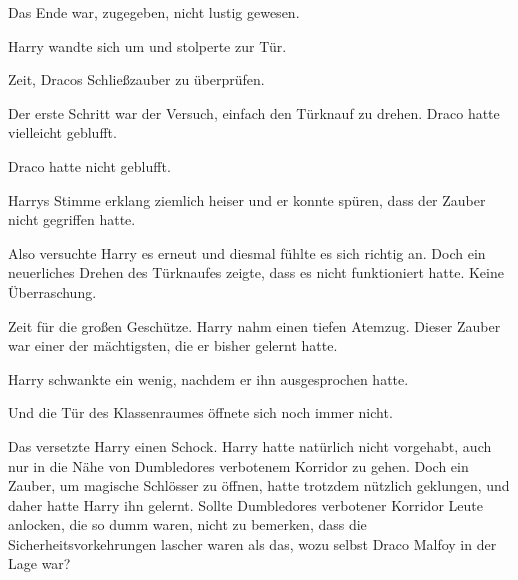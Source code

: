 Das Ende war, zugegeben, nicht lustig gewesen.

Harry wandte sich um und stolperte zur Tür.

Zeit, Dracos Schließzauber zu überprüfen.

Der erste Schritt war der Versuch, einfach den Türknauf zu drehen. Draco hatte vielleicht geblufft.

Draco hatte nicht geblufft.

 Harrys Stimme erklang ziemlich heiser und er konnte spüren, dass der Zauber nicht gegriffen hatte.

Also versuchte Harry es erneut und diesmal fühlte es sich richtig an. Doch ein neuerliches Drehen des Türknaufes zeigte, dass es nicht funktioniert hatte. Keine Überraschung.

Zeit für die großen Geschütze. Harry nahm einen tiefen Atemzug. Dieser Zauber war einer der mächtigsten, die er bisher gelernt hatte.


Harry schwankte ein wenig, nachdem er ihn ausgesprochen hatte.

Und die Tür des Klassenraumes öffnete sich noch immer nicht.

Das versetzte Harry einen Schock. Harry hatte natürlich nicht vorgehabt, auch nur in die Nähe von Dumbledores verbotenem Korridor zu gehen. Doch ein Zauber, um magische Schlösser zu öffnen, hatte trotzdem nützlich geklungen, und daher hatte Harry ihn gelernt. Sollte Dumbledores verbotener Korridor Leute anlocken, die so dumm waren, nicht zu bemerken, dass die Sicherheitsvorkehrungen lascher waren als das, wozu selbst Draco Malfoy in der Lage war?


